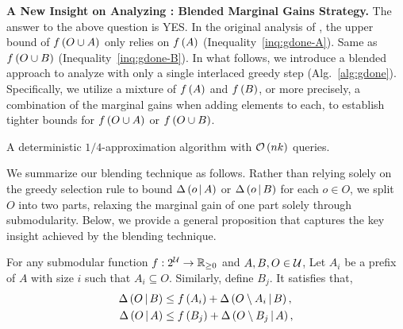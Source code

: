 \textbf{A New Insight on Analyzing \ig: Blended Marginal Gains Strategy.}
The answer to the above question is YES.
In the original analysis of \ig, the upper bound of $f \left( O\cup A \right)$
only relies on $f \left( A \right)$ (Inequality~\eqref{inq:gdone-A}). 
Same as $f \left( O\cup B \right)$ (Inequality~\eqref{inq:gdone-B}).
In what follows,
we introduce a blended approach to analyze \ig with only
a single interlaced greedy step (Alg.~\ref{alg:gdone}).
Specifically, we utilize a mixture of $f \left( A \right)$ and $f \left( B \right)$,
or more precisely, a combination of the marginal gains when adding elements to each,
to establish tighter bounds for $f \left( O\cup A \right)$ or $f \left( O\cup B \right)$.
\begin{algorithm}[ht]
    \caption{A deterministic $1/4$-approximation algorithm with $\mathcal O \left(  nk  \right)$ queries.}
    \label{alg:gdone}
\end{algorithm}

We summarize our blending technique as follows.
Rather than relying solely on the greedy selection rule to 
bound $\Delta \left( o \, \middle| \, A \right)$ or $\Delta \left( o \, \middle| \, B \right)$ for each $o\in O$,
we split $O$ into two parts,
relaxing the marginal gain of one part solely through submodularity.
Below, we provide a general proposition that captures the key
insight achieved by the blending technique.
\begin{proposition}\label{prop:blend}
For any submodular function $f:2^{\mathcal U}\to \mathbb{R}_{\ge 0}$ and $A, B, O \in \mathcal U$,
Let $A_i$ be a prefix of $A$ with size $i$
such that $A_i \subseteq O$.
Similarly, define $B_j$.
It satisfies that,
\begin{align}
    \Delta \left( O \, \middle| \, B \right) &\le f \left( A_i \right) + \Delta \left( O\setminus A_i \, \middle| \, B \right),\label{inq:gdone-B2}\\
    \Delta \left( O \, \middle| \, A \right) &\le f \left( B_j \right) + \Delta \left( O\setminus B_j \, \middle| \, A \right), \label{inq:gdone-A2}
\end{align}
\end{proposition}


